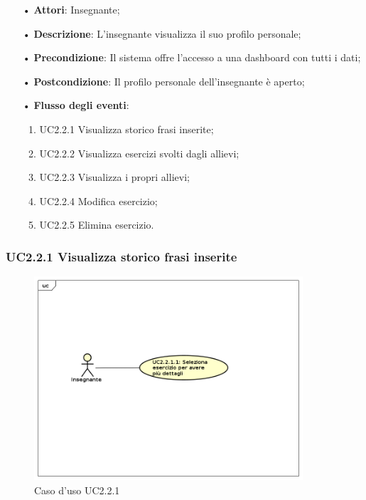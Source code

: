 \begin{itemize}
	\item[•] \textbf{Attori}: Insegnante;
	\item[•] \textbf{Descrizione}: L’insegnante visualizza il suo profilo personale;

	\item[•] \textbf{Precondizione}: Il sistema offre l’accesso a una dashboard con tutti i dati;

	\item[•] \textbf{Postcondizione}:  Il profilo personale dell’insegnante è aperto;
	\item[•] \textbf{Flusso degli eventi}:
		\begin{enumerate}
			\item UC2.2.1 Visualizza storico frasi inserite;
			\item UC2.2.2 Visualizza esercizi svolti dagli allievi;
			\item UC2.2.3 Visualizza i propri allievi;
			\item UC2.2.4 Modifica esercizio;
			\item UC2.2.5 Elimina esercizio.
		\end{enumerate}
\end{itemize}

\subsubsection{UC2.2.1  Visualizza storico frasi inserite}

\begin{figure}[H]
\centering
\includegraphics[width=10cm]{img/UC221.png} 
\caption{Caso d'uso UC2.2.1}
\end{figure}

